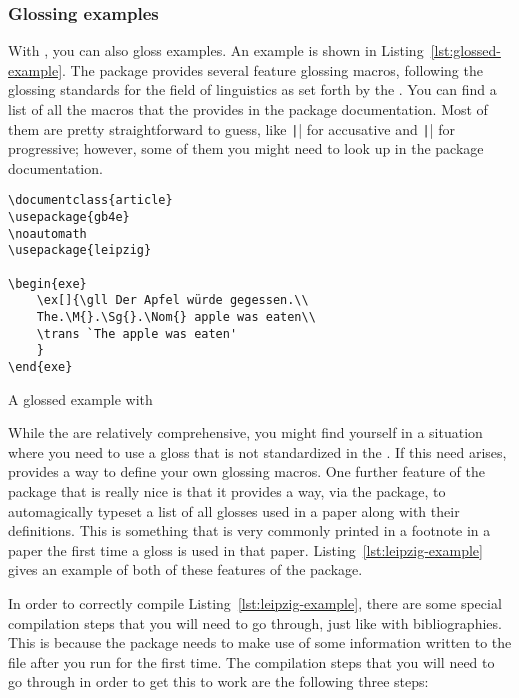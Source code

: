 \subsubsection{Glossing examples}
\label{subsubsec:glossing-examples}

With , you can also gloss examples.
An example is shown in Listing~\ref{lst:glossed-example}.
The package  provides several feature glossing macros, following the glossing standards for the field of linguistics as set forth by the \LGR.
You can find a list of all the macros that the  provides in the package documentation.
Most of them are pretty straightforward to guess, like \texttt|\Acc{}| for accusative and \texttt|\Prog{}| for progressive; however, some of them you might need to look up in the package documentation.

\begin{listing}[htbp]
	\centering
	\begin{verbatim}
\documentclass{article}
\usepackage{gb4e}
\noautomath
\usepackage{leipzig}

\begin{exe}
    \ex[]{\gll Der Apfel würde gegessen.\\
    The.\M{}.\Sg{}.\Nom{} apple was eaten\\
    \trans `The apple was eaten'
    }
\end{exe}

	\end{verbatim}
	\caption{A glossed example with }
	\label{lst:glossed-example}
\end{listing}

While the \LGR{} are relatively comprehensive, you might find yourself in a situation where you need to use a gloss that is not standardized in the \LGR.
If this need arises,  provides a way to define your own glossing macros.
One further feature of the  package that is really nice is that it provides a way, via the  package, to automagically typeset a list of all glosses used in a paper along with their definitions.
This is something that is very commonly printed in a footnote in a paper the first time a gloss is used in that paper.
Listing~\ref{lst:leipzig-example} gives an example of both of these features of the package.

In order to correctly compile Listing~\ref{lst:leipzig-example}, there are some special compilation steps that you will need to go through, just like with bibliographies.
This is because the  package needs to make use of some information written to the  file after you run  for the first time.
The compilation steps that you will need to go through in order to get this to work are the following three steps:

